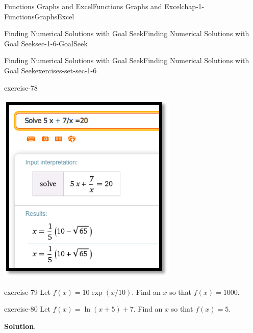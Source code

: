 \documentclass[oneside,10pt,]{book}
\numberwithin{equation}{section}
\begin{document}
\begin{chapterptx}{Functions Graphs and Excel}{}{Functions Graphs and Excel}{}{}{chap-1-FunctionsGraphsExcel}
\begin{sectionptx}{Finding Numerical Solutions with Goal Seek}{}{Finding Numerical Solutions with Goal Seek}{}{}{sec-1-6-GoalSeek}
\begin{exercises-subsection-numberless}{Finding Numerical Solutions with Goal Seek}{}{Finding Numerical Solutions with Goal Seek}{}{}{exercises-set-sec-1-6}
\begin{divisionexercise}{3}{}{}{exercise-78}
\begin{sidebyside}{1}{0.2}{0.2}{0}
\begin{sbspanel}{0.6}
\includegraphics[width=1\linewidth]{images/sec1-6-sol3a.png}
\end{sbspanel}%
\end{sidebyside}%
%
\end{divisionexercise}%
\begin{divisionexercise}{4}{}{}{exercise-79}%
\hypertarget{p-508}{}%
Let \(f(x) = 10 \exp(x/10)\).  Find an \(x\) so that \(f(x) = 1000\).%
\end{divisionexercise}%
\begin{divisionexercise}{5}{}{}{exercise-80}%
\hypertarget{p-509}{}%
Let \(f(x) = \ln(x+5) + 7\).  Find an \(x\) so that \(f(x) = 5\).%
\par\smallskip%
\noindent\textbf{Solution}.\hypertarget{solution-38}{}\quad%
\hypertarget{p-510}{}%
\leavevmode%
\begin{sidebyside}{1}{0}{0}{0}%
\begin{sbspanel}{1}%

\end{sbspanel}
\end{sidebyside}
\end{divisionexercise}
\end{exercises-subsection-numberless}
\end{sectionptx}
\end{chapterptx}
\end{document}
